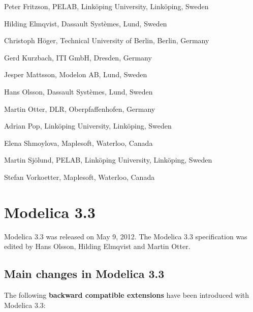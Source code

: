 \documentclass[10pt,a4paper]{report}
\def\doublelabel#1{\label{#1}}
\begin{document}
Peter Fritzson, PELAB, Linköping University, Linköping, Sweden

Hilding Elmqvist, Dassault Systèmes, Lund, Sweden

Christoph Höger, Technical University of Berlin, Berlin, Germany

Gerd Kurzbach, ITI GmbH, Dresden, Germany

Jesper Mattsson, Modelon AB, Lund, Sweden

Hans Olsson, Dassault Systèmes, Lund, Sweden

Martin Otter, DLR, Oberpfaffenhofen, Germany

Adrian Pop, Linköping University, Linköping, Sweden

Elena Shmoylova, Maplesoft, Waterloo, Canada

Martin Sjölund, PELAB, Linköping University, Linköping, Sweden

Stefan Vorkoetter, Maplesoft, Waterloo, Canada

\section{Modelica 3.3}\doublelabel{modelica-3-3}

Modelica 3.3 was released on May 9, 2012. The Modelica 3.3 specification
was edited by Hans Olsson, Hilding Elmqvist and Martin Otter.

\subsection{Main changes in Modelica 3.3}\doublelabel{main-changes-in-modelica-3-3}

The following \textbf{backward compatible extensions} have been
introduced with Modelica 3.3:
\end{document}
